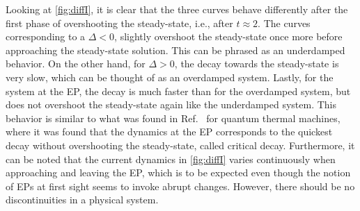 \documentclass[../main.tex]{subfiles}
\begin{document}
Looking at \cref{fig:diffI}, it is clear that the three curves behave differently after the first phase of overshooting the steady-state, i.e., after $t\approx 2$. The curves corresponding to a $\Delta<0$, slightly overshoot the steady-state once more before approaching the steady-state solution. This can be phrased as an underdamped behavior. On the other hand, for $\Delta>0$, the decay towards the steady-state is very slow, which can be thought of as an overdamped system. Lastly, for the system at the EP, the decay is much faster than for the overdamped system, but does not overshoot the steady-state again like the underdamped system. This behavior is similar to what was found in Ref.~\cite{thermal} for quantum thermal machines, where it was found that the dynamics at the EP corresponds to the quickest decay without overshooting the steady-state, called critical decay. Furthermore, it can be noted that the current dynamics in \cref{fig:diffI} varies continuously when approaching and leaving the EP, which is to be expected even though the notion of EPs at first sight seems to invoke abrupt changes. However, there should be no discontinuities in a physical system.  
\end{document}
